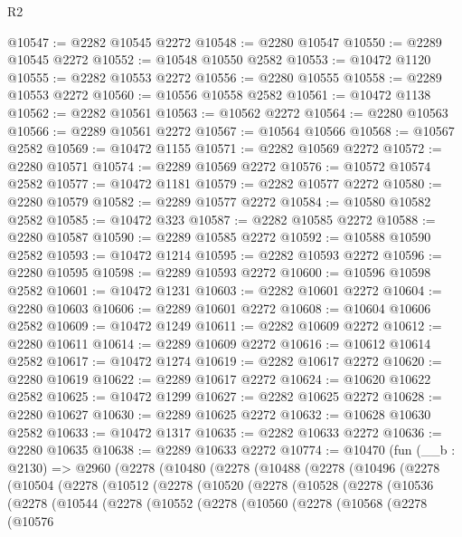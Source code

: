 \begin{lexlean}{R2}
\begin{coremodule}
@10547 := @2282 @10545 @2272
@10548 := @2280 @10547
@10550 := @2289 @10545 @2272
@10552 := @10548 @10550 @2582
@10553 := @10472 @1120
@10555 := @2282 @10553 @2272
@10556 := @2280 @10555
@10558 := @2289 @10553 @2272
@10560 := @10556 @10558 @2582
@10561 := @10472 @1138
@10562 := @2282 @10561
@10563 := @10562 @2272
@10564 := @2280 @10563
@10566 := @2289 @10561 @2272
@10567 := @10564 @10566
@10568 := @10567 @2582
@10569 := @10472 @1155
@10571 := @2282 @10569 @2272
@10572 := @2280 @10571
@10574 := @2289 @10569 @2272
@10576 := @10572 @10574 @2582
@10577 := @10472 @1181
@10579 := @2282 @10577 @2272
@10580 := @2280 @10579
@10582 := @2289 @10577 @2272
@10584 := @10580 @10582 @2582
@10585 := @10472 @323
@10587 := @2282 @10585 @2272
@10588 := @2280 @10587
@10590 := @2289 @10585 @2272
@10592 := @10588 @10590 @2582
@10593 := @10472 @1214
@10595 := @2282 @10593 @2272
@10596 := @2280 @10595
@10598 := @2289 @10593 @2272
@10600 := @10596 @10598 @2582
@10601 := @10472 @1231
@10603 := @2282 @10601 @2272
@10604 := @2280 @10603
@10606 := @2289 @10601 @2272
@10608 := @10604 @10606 @2582
@10609 := @10472 @1249
@10611 := @2282 @10609 @2272
@10612 := @2280 @10611
@10614 := @2289 @10609 @2272
@10616 := @10612 @10614 @2582
@10617 := @10472 @1274
@10619 := @2282 @10617 @2272
@10620 := @2280 @10619
@10622 := @2289 @10617 @2272
@10624 := @10620 @10622 @2582
@10625 := @10472 @1299
@10627 := @2282 @10625 @2272
@10628 := @2280 @10627
@10630 := @2289 @10625 @2272
@10632 := @10628 @10630 @2582
@10633 := @10472 @1317
@10635 := @2282 @10633 @2272
@10636 := @2280 @10635
@10638 := @2289 @10633 @2272
@10774 := @10470
    (fun (__b : @2130) =>
    @2960
      (@2278
        (@10480
          (@2278
            (@10488
              (@2278
                (@10496
                  (@2278
                    (@10504
                      (@2278
                        (@10512
                          (@2278
                            (@10520
                              (@2278
                                (@10528
                                  (@2278
                                    (@10536
                                      (@2278
                                        (@10544
                                          (@2278
                                            (@10552
                                              (@2278
                                                (@10560
                                                  (@2278
                                                    (@10568
                                                      (@2278
                                                        (@10576

\end{coremodule}
\end{lexlean}
